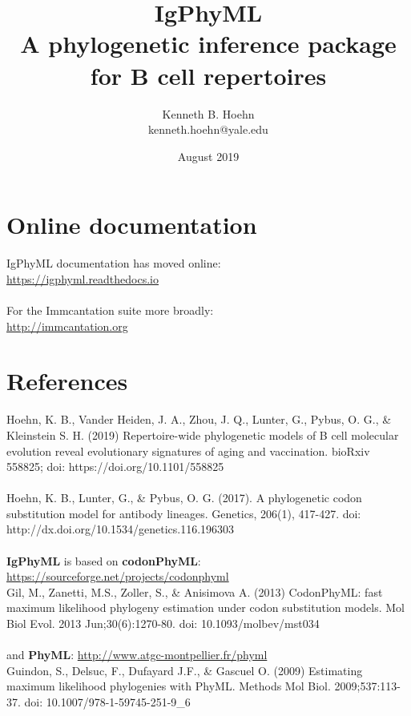 \documentclass[11pt, letterpaper]{article}
\begin{document}
\sloppy
\title{IgPhyML\\A phylogenetic inference package for B cell repertoires}
\author{Kenneth B. Hoehn\\kenneth.hoehn@yale.edu}
\date{August 2019}

\maketitle


\section*{Online documentation}

IgPhyML documentation has moved online:\\ \url{https://igphyml.readthedocs.io}
\\~\\
For the Immcantation suite more broadly:\\
\url{http://immcantation.org}


\section*{References}
Hoehn, K. B., Vander Heiden, J. A., Zhou, J. Q., Lunter, G., Pybus, O. G., \& Kleinstein S. H. (2019) Repertoire-wide phylogenetic models of B cell molecular evolution reveal evolutionary signatures of aging and vaccination. bioRxiv 558825; doi: https://doi.org/10.1101/558825 
\\~\\
Hoehn, K. B., Lunter, G., \& Pybus, O. G. (2017). A phylogenetic codon substitution model for antibody lineages. Genetics, 206(1), 417-427. doi: http://dx.doi.org/10.1534/genetics.116.196303 
\\~\\
\noindent \textbf{IgPhyML} is based on \textbf{codonPhyML}: \url{https://sourceforge.net/projects/codonphyml}\\
Gil, M., Zanetti, M.S., Zoller, S., \& Anisimova A. (2013) CodonPhyML: fast maximum likelihood phylogeny estimation under codon substitution models. Mol Biol Evol. 2013 Jun;30(6):1270-80. doi: 10.1093/molbev/mst034
\\~\\
and \textbf{PhyML}: \url{http://www.atgc-montpellier.fr/phyml}\\
Guindon, S., Delsuc, F., Dufayard J.F., \& Gascuel O. (2009) Estimating maximum likelihood phylogenies with PhyML. Methods Mol Biol. 2009;537:113-37. doi: 10.1007/978-1-59745-251-9\_6
\end{document}
